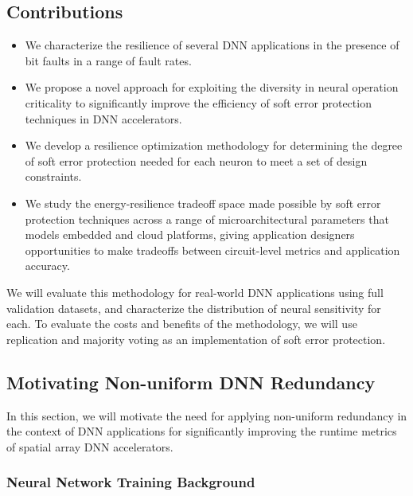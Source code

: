 \subsection{Contributions}

\begin{itemize}
\item We characterize the resilience of several DNN applications in the presence of bit faults in a range of fault rates.
\item We propose a novel approach for exploiting the diversity in neural operation criticality to significantly improve the efficiency of soft error protection techniques in DNN accelerators.
\item We develop a resilience optimization methodology for determining the degree of soft error protection needed for each neuron to meet a set of design constraints.
\item We study the energy-resilience tradeoff space made possible by soft error protection techniques across a range of microarchitectural parameters that models embedded and cloud platforms, giving application designers opportunities to make tradeoffs between circuit-level metrics and application accuracy.
\end{itemize}

We will evaluate this methodology for real-world DNN applications using full validation datasets, and characterize the distribution of neural sensitivity for each.
To evaluate the costs and benefits of the methodology, we will use replication and majority voting as an implementation of soft error protection.

\subsection{Motivating Non-uniform DNN Redundancy}

In this section, we will motivate the need for applying non-uniform redundancy in the context of DNN applications for significantly improving the runtime metrics of spatial array DNN accelerators.

\subsubsection{Neural Network Training Background}

